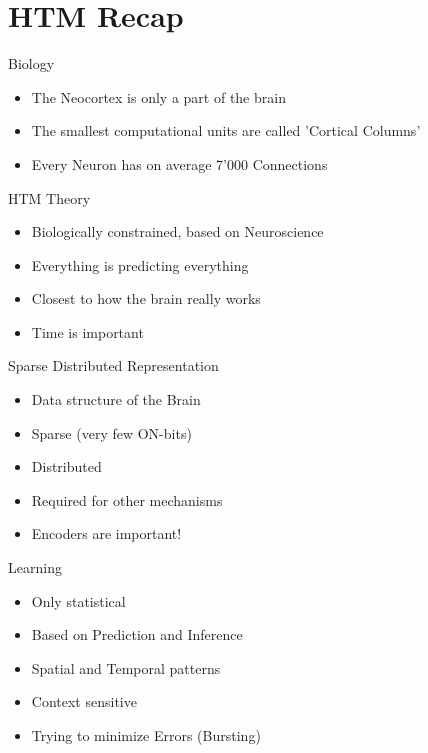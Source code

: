 \section{HTM Recap}

\begin{frame}[c]{Biology}
    \Large
    \begin{itemize}[<+(1)->]
        \item The Neocortex is only a part of the brain
        \item The smallest computational units are called 'Cortical Columns'
        \item Every Neuron has on average 7'000 Connections 
    \end{itemize}
\end{frame}


\begin{frame}[c]{HTM Theory}
    \Large
    \begin{itemize}[<+(1)->]
        \item Biologically constrained, based on Neuroscience
        \item Everything is predicting everything
        \item Closest to how the brain really works
        \item Time is important
    \end{itemize}
\end{frame}


\begin{frame}[c]{Sparse Distributed Representation}
    \Large
    \begin{itemize}[<+(1)->]
        \item Data structure of the Brain
        \item Sparse (very few ON-bits)
        \item Distributed
        \item Required for other mechanisms
        \item Encoders are important!
    \end{itemize}
\end{frame}


\begin{frame}[c]{Learning}
    \Large
    \begin{itemize}[<+(1)->]
        \item Only statistical
        \item Based on Prediction and Inference
        \item Spatial and Temporal patterns
        \item Context sensitive
        \item Trying to minimize Errors (Bursting)
    \end{itemize}
\end{frame}



